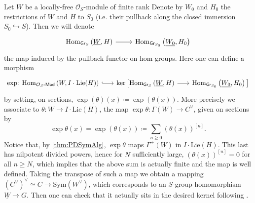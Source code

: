 \begin{defn}
	Let $W$ be a locally-free $\mathcal{O}_{ S }$-module of finite rank
	Denote by $W_0$ and $H_0$ the restrictions of $W$ and $H$ to 
	$S_0$ (i.e. their pullback along
	the closed immersion $S_0 \hookrightarrow S$).
	Then we will denote
	\begin{equation*}
	\begin{tikzcd}[row sep = 0ex
		,/tikz/column 1/.append style={anchor=base east}
		,/tikz/column 2/.append style={anchor=base west}]
		\mathrm{Hom}_{ \mathsf{Gr}_S } 
		\left( \underline{W}, H \right)
		\arrow[r, "", rightarrow] &
		\mathrm{Hom}_{ \mathsf{Gr}_{S_0} }
		\left( \underline{W_0}, H_0 \right)
	\end{tikzcd}
	\end{equation*} 
	the map induced by the pullback functor on hom groups.
	Here one can define a morphism
	\begin{equation*}
	\begin{tikzcd}[row sep = 0ex, column sep = 1.8em
		,/tikz/column 1/.append style={anchor=base east}
		,/tikz/column 2/.append style={anchor=base west}]
		\exp\colon
		\mathrm{Hom}_{ \mathcal{O}_{ S }\text{-}\mathsf{Mod} }
		\left( W, I \cdot \mathrm{Lie}(H) \right)
		\arrow[r, "", hookrightarrow] &
		\ker \big[ 
		\mathrm{Hom}_{ \mathsf{Gr}_S } 
		\left( \underline{W}, H \right)
		\arrow[r, "", rightarrow] &
		\mathrm{Hom}_{ \mathsf{Gr}_{S_0} }
		\left( \underline{W_0}, H_0 \right)
		\big]
	\end{tikzcd}
	\end{equation*} 
	by setting, on sections,
	$\exp (\theta) (x) \coloneqq \exp \left( \theta(x) \right)$.
	More precisely we associate to $\theta\colon W \to I \cdot \mathrm{Lie}(H)$,
	the map $\exp \theta\colon \Gamma(W) \to C^\vee$, given on sections by
	\begin{equation*}
	\exp \theta (x) =
	\exp \left( \theta(x) \right) \coloneqq
	\sum_{n\geq 0 } (\theta(x))^{[n]}
	.\end{equation*}
	Notice that, by \cref{thm:PDSymAlg}, $\exp \theta$
	maps $\Gamma^+(W)$ in $I \cdot \mathrm{Lie}(H)$.
	This last has nilpotent divided powers, hence for $N$ sufficiently
	large, $(\theta(x))^{[n]} = 0$ for all $n \geq N$,
	which implies that the above sum is actually finite
	and the map is well defined.
	Taking the transpose of such a map we obtain a mapping 
	$(C^\vee)^\vee \simeq C \to \mathrm{Sym}(W^\vee)$, which corresponds
	to an $S$-group homomorphism $\underline{W} \to G$.
	Then one can check that it actually sits in the desired kernel
	following \cite[Chapter III, \S2.4, 2.6]{Messing}.
\end{defn}



